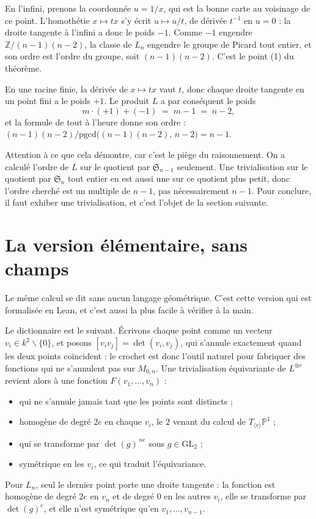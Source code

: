 \documentclass[11pt,a4paper]{amsart}
\theoremstyle{definition}
\theoremstyle{plain}
\theoremstyle{remark}
\newcommand{\M}{M_{0,n}}
\newcommand{\Sn}{\mathfrak S}
\newcommand{\PP}{\mathbb P^1}
\begin{document}
En l'infini, prenons la coordonnée $u = 1/x$, qui est la bonne carte au voisinage de ce point. L'homothétie $x \mapsto tx$ s'y écrit $u \mapsto u/t$, de dérivée $t^{-1}$ en $u = 0$ : la droite tangente à l'infini a donc le poids $-1$. Comme $-1$ engendre $\mathbb Z/(n-1)(n-2)$, la classe de $L_n$ engendre le groupe de Picard tout entier, et son ordre est l'ordre du groupe, soit $(n-1)(n-2)$. C'est le point (1) du théorème.

En une racine finie, la dérivée de $x \mapsto tx$ vaut $t$, donc chaque droite tangente en un point fini a le poids $+1$. Le produit $L$ a par conséquent le poids
\[
m \cdot (+1) + (-1) \;=\; m-1 \;=\; n-2,
\]
et la formule de tout à l'heure donne son ordre : $(n-1)(n-2)/\mathrm{pgcd}\bigl((n-1)(n-2),\,n-2\bigr) = n-1$.

Attention à ce que cela démontre, car c'est le piège du raisonnement. On a calculé l'ordre de $L$ sur le quotient par $\Sn_{n-1}$ seulement. Une trivialisation sur le quotient par $\Sn_n$ tout entier en est aussi une sur ce quotient plus petit, donc l'ordre cherché est un multiple de $n-1$, pas nécessairement $n-1$. Pour conclure, il faut exhiber une trivialisation, et c'est l'objet de la section suivante.

\section{La version élémentaire, sans champs}

Le même calcul se dit sans aucun langage géométrique. C'est cette version qui est formalisée en Lean, et c'est aussi la plus facile à vérifier à la main.

Le dictionnaire est le suivant. Écrivons chaque point comme un vecteur $v_i \in k^2 \smallsetminus\{0\}$, et posons $[v_iv_j] = \det(v_i, v_j)$, qui s'annule exactement quand les deux points coïncident : le crochet est donc l'outil naturel pour fabriquer des fonctions qui ne s'annulent pas sur $\M$. Une trivialisation équivariante de $L^{\otimes e}$ revient alors à une fonction $F(v_1, \dots, v_n)$ :
\begin{itemize}
\item qui ne s'annule jamais tant que les points sont distincts ;
\item homogène de degré $2e$ en chaque $v_i$, le $2$ venant du calcul de $T_{\langle v\rangle}\PP$ ;
\item qui se transforme par $\det(g)^{\,n e}$ sous $g \in \mathrm{GL}_2$ ;
\item symétrique en les $v_i$, ce qui traduit l'équivariance.
\end{itemize}
Pour $L_n$, seul le dernier point porte une droite tangente : la fonction est homogène de degré $2e$ en $v_n$ et de degré $0$ en les autres $v_i$, elle se transforme par $\det(g)^{e}$, et elle n'est symétrique qu'en $v_1, \dots, v_{n-1}$.
\end{document}
